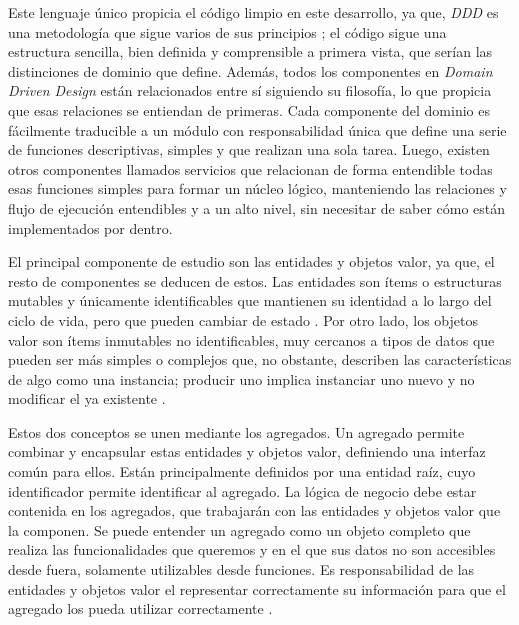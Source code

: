 Este lenguaje único propicia el código limpio en este desarrollo, ya que,
\textit{DDD} es una metodología que sigue varios de sus principios
\cite{clean_code_rules}; el código sigue una estructura sencilla, bien definida
y comprensible a primera vista, que serían las distinciones de dominio que
define. Además, todos los componentes en \textit{Domain Driven Design} están
relacionados entre sí siguiendo su filosofía, lo que propicia que esas
relaciones se entiendan de primeras. Cada componente del dominio es fácilmente
traducible a un módulo con responsabilidad única que define una serie de
funciones descriptivas, simples y que realizan una sola tarea. Luego, existen
otros componentes llamados servicios que relacionan de forma entendible todas
esas funciones simples para formar un núcleo lógico, manteniendo las relaciones
y flujo de ejecución entendibles y a un alto nivel, sin necesitar de saber cómo
están implementados por dentro.

El principal componente de estudio son las entidades y objetos valor, ya que, el
resto de componentes se deducen de estos. Las entidades son ítems o estructuras
mutables y únicamente identificables que mantienen su identidad a lo largo del
ciclo de vida, pero que pueden cambiar de estado \cite{jannik_ddd}. Por otro
lado, los objetos valor son ítems inmutables no identificables, muy cercanos a
tipos de datos que pueden ser más simples o complejos que, no obstante,
describen las características de algo como una instancia; producir uno implica
instanciar uno nuevo y no modificar el ya existente \cite{jannik_ddd}.

Estos dos conceptos se unen mediante los agregados. Un agregado permite combinar
y encapsular estas entidades y objetos valor, definiendo una interfaz común para
ellos. Están principalmente definidos por una entidad raíz, cuyo identificador
permite identificar al agregado. La lógica de negocio debe estar contenida en
los agregados, que trabajarán con las entidades y objetos valor que la componen.
Se puede entender un agregado como un objeto completo que realiza las
funcionalidades que queremos y en el que sus datos no son accesibles desde
fuera, solamente utilizables desde funciones. Es responsabilidad de las
entidades y objetos valor el representar correctamente su información para que
el agregado los pueda utilizar correctamente \cite{ddd_golang}.


